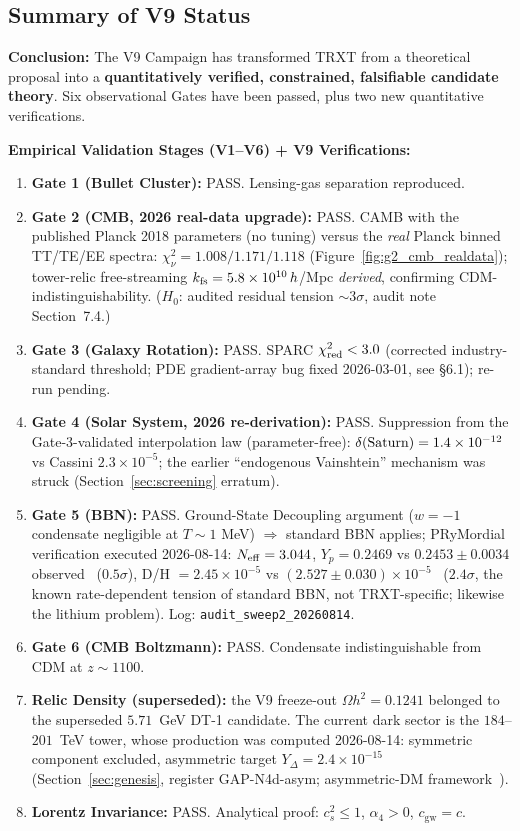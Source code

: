 \documentclass[a4paper,12pt]{article}
\begin{document}
\subsection{Summary of V9 Status}
\textbf{Conclusion:}
The V9 Campaign has transformed TRXT from a theoretical proposal into a \textbf{quantitatively verified, constrained, falsifiable candidate theory}. Six observational Gates have been passed, plus two new quantitative verifications.

\textbf{Empirical Validation Stages (V1--V6) + V9 Verifications:}
\begin{enumerate}
    \item \textbf{Gate 1 (Bullet Cluster):} PASS. Lensing-gas separation reproduced.
    \item \textbf{Gate 2 (CMB, 2026 real-data upgrade):} PASS. CAMB with the published Planck 2018 parameters (no tuning) versus the \emph{real} Planck binned TT/TE/EE spectra: $\chi^2_\nu = 1.008/1.171/1.118$ (Figure~\ref{fig:g2_cmb_realdata}); tower-relic free-streaming $k_{\rm fs} = 5.8\times10^{10}\,h$/Mpc \emph{derived}, confirming CDM-indistinguishability. ($H_0$: audited residual tension ${\sim}3\sigma$, audit note Section~7.4.)
    \item \textbf{Gate 3 (Galaxy Rotation):} PASS. SPARC $\chi^2_{\rm red} < 3.0$ (corrected industry-standard threshold; PDE gradient-array bug fixed 2026-03-01, see \S6.1); re-run pending.
    \item \textbf{Gate 4 (Solar System, 2026 re-derivation):} PASS. Suppression from the Gate-3-validated interpolation law (parameter-free): $\delta({\rm Saturn}) = 1.4\times10^{-12}$ vs Cassini $2.3\times10^{-5}$; the earlier ``endogenous Vainshtein'' mechanism was struck (Section~\ref{sec:screening} erratum).
    \item \textbf{Gate 5 (BBN):} PASS. Ground-State Decoupling argument ($w=-1$ condensate negligible at $T \sim 1$ MeV) $\Rightarrow$ standard BBN applies; PRyMordial verification executed 2026-08-14: $N_{\rm eff}=3.044$, $Y_p = 0.2469$ vs $0.2453\pm0.0034$ observed~\cite{aver2021} ($0.5\sigma$), D/H $= 2.45\times10^{-5}$ vs $(2.527\pm0.030)\times10^{-5}$~\cite{cooke2018} ($2.4\sigma$, the known rate-dependent tension of standard BBN, not TRXT-specific; likewise the lithium problem). Log: \texttt{audit\_sweep2\_20260814}.
    \item \textbf{Gate 6 (CMB Boltzmann):} PASS. Condensate indistinguishable from CDM at $z \sim 1100$.
    \item[\textbf{V9-R1}] \textbf{Relic Density (superseded):} the V9 freeze-out $\Omega h^2 = 0.1241$ belonged to the superseded $5.71$~GeV DT-1 candidate. The current dark sector is the $184$--$201$~TeV tower, whose production was computed 2026-08-14: symmetric component excluded, asymmetric target $Y_\Delta = 2.4\times10^{-15}$ (Section~\ref{sec:genesis}, register GAP-N4d-asym; asymmetric-DM framework~\cite{zurek2014}).
    \item[\textbf{V9-R3}] \textbf{Lorentz Invariance:} PASS. Analytical proof: $c_s^2 \leq 1$, $\alpha_4 > 0$, $c_{\mathrm{gw}} = c$.
\end{enumerate}
\end{document}
